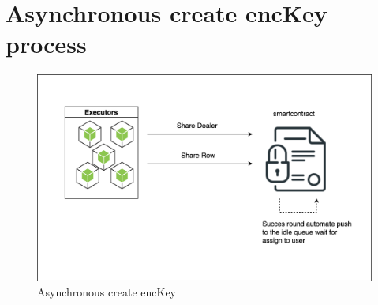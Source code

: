 \documentclass[../Main.tex]{subfiles}
\begin{document}
\section{Asynchronous create encKey process}
\begin{figure}[H]
 \centering
 \includegraphics[scale=0.14]{Figure/executor-contribute.png}
 \caption{Asynchronous create encKey}
    \label{fig:create-encKey}
\end{figure}
\end{document}
